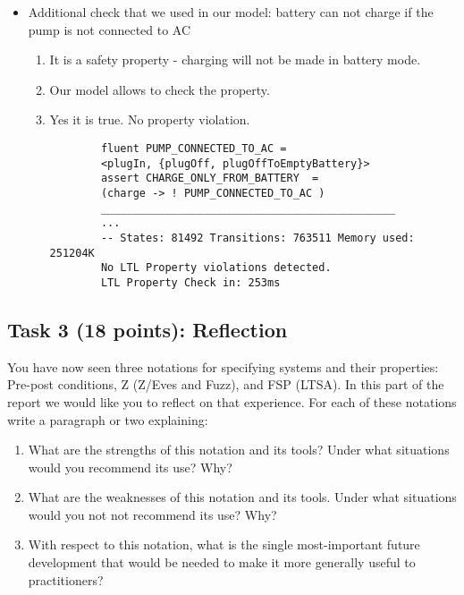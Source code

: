 \documentclass{article}
\newcommand{\head}{\subsection*}
\begin{document}
\begin{enumerate}
\begin{itemize}
\begin{enumerate}
\begin{verbatim}
    	\end{verbatim}
    	\end{enumerate}
    	
    	\item Additional check that we used in our model: battery can not charge if the pump is not connected to AC
    	 \begin{enumerate}
    	 	\item It is a safety property - charging will not be made in battery mode.
    	\item Our model allows to check the property.
    	 \item Yes it is true. No property violation.
    	 \begin{verbatim}
    	fluent PUMP_CONNECTED_TO_AC =
    	<plugIn, {plugOff, plugOffToEmptyBattery}>
    	assert CHARGE_ONLY_FROM_BATTERY  = 
    	(charge -> ! PUMP_CONNECTED_TO_AC )
    	______________________________________________
    	...
    	-- States: 81492 Transitions: 763511 Memory used: 251204K
    	No LTL Property violations detected.
    	LTL Property Check in: 253ms
    	\end{verbatim}
    	\end{enumerate}
    	\end{itemize}
    	    
\end{enumerate}

\head{Task 3 (18 points): Reflection}

 You have now seen three notations for specifying systems and their properties: Pre-post conditions,
 Z (Z/Eves and Fuzz), and FSP (LTSA).  In this part of the report we would like you to reflect on that experience.
 For each of these notations write a paragraph or two explaining:
\begin{enumerate}
 \item What are the strengths of this notation and its tools?  Under what situations would you
recommend its use? Why?
 \item What are the weaknesses of this notation and its tools. Under what
situations would you not not recommend its use? Why?
 \item With respect to this notation, what is
the single most-important future development that would be needed to make it more generally useful
to practitioners?
\end{enumerate}
\end{document}
